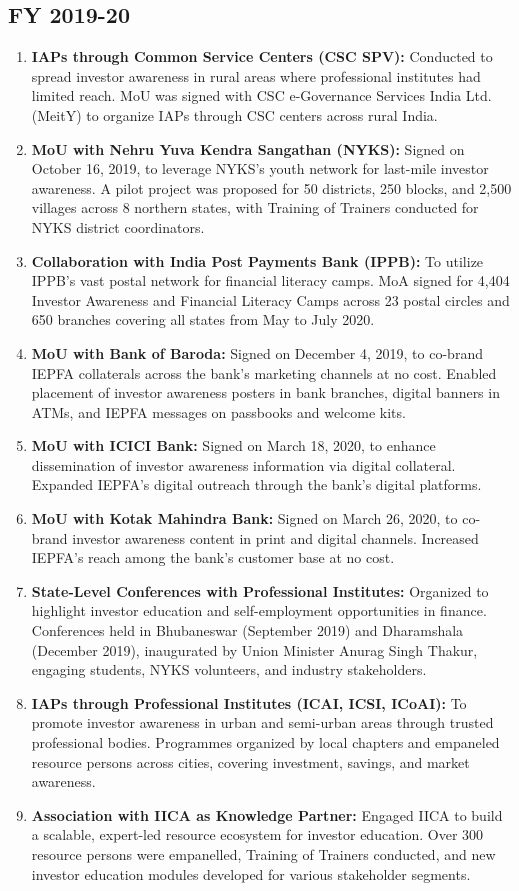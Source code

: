 \documentclass[openany]{book}
\begin{document}
\subsection{FY 2019-20}
\begin{enumerate}
    \item \textbf{IAPs through Common Service Centers (CSC SPV):} Conducted to spread investor awareness in rural areas where professional institutes had limited reach. MoU was signed with CSC e-Governance Services India Ltd. (MeitY) to organize IAPs through CSC centers across rural India.
    \item \textbf{MoU with Nehru Yuva Kendra Sangathan (NYKS):} Signed on October 16, 2019, to leverage NYKS's youth network for last-mile investor awareness. A pilot project was proposed for 50 districts, 250 blocks, and 2,500 villages across 8 northern states, with Training of Trainers conducted for NYKS district coordinators.
    \item \textbf{Collaboration with India Post Payments Bank (IPPB):} To utilize IPPB's vast postal network for financial literacy camps. MoA signed for 4,404 Investor Awareness and Financial Literacy Camps across 23 postal circles and 650 branches covering all states from May to July 2020.
    \item \textbf{MoU with Bank of Baroda:} Signed on December 4, 2019, to co-brand IEPFA collaterals across the bank's marketing channels at no cost. Enabled placement of investor awareness posters in bank branches, digital banners in ATMs, and IEPFA messages on passbooks and welcome kits.
    \item \textbf{MoU with ICICI Bank:} Signed on March 18, 2020, to enhance dissemination of investor awareness information via digital collateral. Expanded IEPFA's digital outreach through the bank's digital platforms.
    \item \textbf{MoU with Kotak Mahindra Bank:} Signed on March 26, 2020, to co-brand investor awareness content in print and digital channels. Increased IEPFA's reach among the bank's customer base at no cost.
    \item \textbf{State-Level Conferences with Professional Institutes:} Organized to highlight investor education and self-employment opportunities in finance. Conferences held in Bhubaneswar (September 2019) and Dharamshala (December 2019), inaugurated by Union Minister Anurag Singh Thakur, engaging students, NYKS volunteers, and industry stakeholders.
    \item \textbf{IAPs through Professional Institutes (ICAI, ICSI, ICoAI):} To promote investor awareness in urban and semi-urban areas through trusted professional bodies. Programmes organized by local chapters and empaneled resource persons across cities, covering investment, savings, and market awareness.
    \item \textbf{Association with IICA as Knowledge Partner:} Engaged IICA to build a scalable, expert-led resource ecosystem for investor education. Over 300 resource persons were empanelled, Training of Trainers conducted, and new investor education modules developed for various stakeholder segments.
\end{enumerate}
\end{document}
